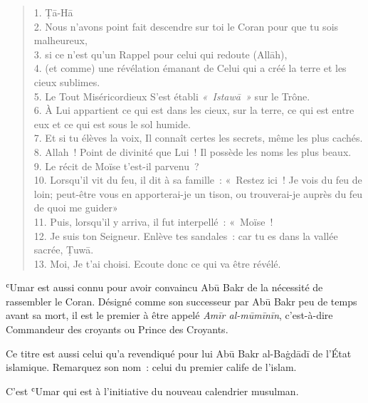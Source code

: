 \begin{quote}
    

1. Ṭā-Hā\\
{2.}
Nous n'avons point fait descendre sur toi le Coran pour que tu sois
malheureux,\\
{3.}
si ce n'est qu'un Rappel pour celui qui redoute (Allāh),\\
{4.}
(et comme) une révélation émanant de Celui qui a créé la terre et les
cieux sublimes.\\
{5.}
Le Tout Miséricordieux S'est établi \emph{«~Istawā~»} sur le Trône.\\
{6.}
À Lui appartient ce qui est dans les cieux, sur la terre, ce qui est
entre eux et ce qui est sous le sol humide.\\
{7.}
Et si tu élèves la voix, Il connaît certes les secrets, même les plus
cachés.\\
{8.}
Allah~! Point de divinité que Lui~! Il possède les noms les plus
beaux.\\
{9.}
Le récit de Moïse t'est-il parvenu~?\\
{10.}
Lorsqu'il vit du feu, il dit à sa famille~: «~Restez ici~! Je vois du
feu de loin; peut-être vous en apporterai-je un tison, ou trouverai-je
auprès du feu de quoi me
guider»\\
{11.}
Puis, lorsqu'il y arriva, il fut interpellé~: «~Moïse~!\\
{12.}
Je suis ton Seigneur. Enlève tes sandales~: car tu es dans la vallée
sacrée, Ṭuwā.\\
{13.}
Moi, Je t'ai choisi. Ecoute donc ce qui va être révélé.
\end{quote}
ʿUmar est aussi connu pour avoir convaincu Abū Bakr de la nécessité de
rassembler le Coran. Désigné comme son successeur par Abū Bakr peu de
temps avant sa mort, il est le premier à être appelé \emph{Amīr
al-mūmīnīn}, c'est-à-dire Commandeur des croyants ou Prince des
Croyants.



Ce titre est aussi celui qu'a revendiqué pour lui Abū Bakr al-Baġdādī de
l'État islamique. Remarquez son nom~: celui du premier calife de
l'islam.

C'est ʿUmar qui est à l'initiative du nouveau calendrier musulman.

